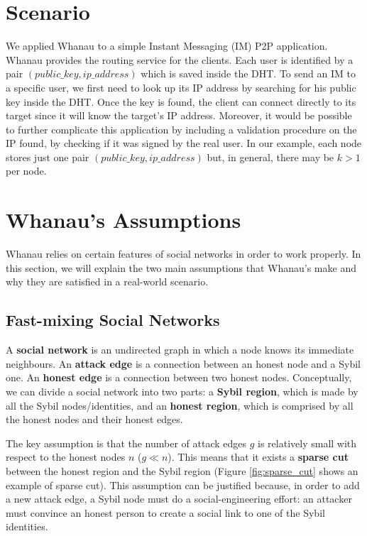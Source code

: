 \section{Scenario\label{scenario}}
We applied Whanau to a simple Instant Messaging (IM) P2P application. Whanau provides the routing service for the clients. Each user is identified by a pair $(public\_key, ip\_address)$ which is saved inside the DHT. To send an IM to a specific user, we first need to look up its IP address by searching for his public key inside the DHT. Once the key is found, the client can connect directly to its target since it will know the target's IP address. Moreover, it would be possible to further complicate this application by including a validation procedure on the IP found, by checking if it was signed by the real user.  In our example, each node stores just one pair $(public\_key, ip\_address)$ but, in general, there may be $k>1$ per node. 

\section{Whanau's Assumptions\label{assumpt}}
Whanau relies on certain features of social networks in order to work properly. In this section, we will explain the two main assumptions that Whanau's make and why they are satisfied in a real-world scenario.

\subsection{Fast-mixing Social Networks}

A \textbf{social network} is an undirected graph in which a node knows its immediate neighbours. An \textbf{attack edge} is a connection between an honest node and a Sybil one.  An \textbf{honest edge} is a connection between two honest nodes.
Conceptually, we can divide a social network into two parts: a \textbf{Sybil region}, which is made by all the Sybil nodes/identities, and an \textbf{honest region}, which is comprised by all the honest nodes and their honest edges.

The key assumption is that the number of attack edges $g$ is relatively small with respect to the honest nodes $n$ ($g \ll n$). This means that it exists a \textbf{sparse cut} between the honest region and the Sybil region (Figure \ref{fig:sparse_cut} shows an example of sparse cut). This assumption can be justified because, in order to add a new attack edge, a Sybil node must do a social-engineering effort: an attacker must convince an honest person to create a social link to one of the Sybil identities.

